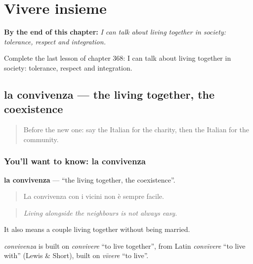 
\chapter{Vivere insieme}
\label{ch:it-vivere-insieme}

\begin{chapteropening}
\textbf{By the end of this chapter:} \emph{I can talk about living together in society: tolerance, respect and integration.}

Complete the last lesson of chapter 368: I can talk about living together in society: tolerance, respect and integration.
\end{chapteropening}

\section[la convivenza]{la convivenza — the living together, the coexistence}

\label{lesson:IT-C368-convivenza}



\begin{quote}
Before the new one: say the Italian for the charity, then the Italian for the community.
\end{quote}

\subsection*{You'll want to know: la convivenza}
\textbf{la convivenza} — \textquotedblleft{}the living together, the coexistence\textquotedblright{}.

\begin{quote}
La convivenza con i vicini non è sempre facile.
\end{quote}

\begin{quote}
\emph{Living alongside the neighbours is not always easy.}
\end{quote}

It also means a couple living together without being married.

\begin{cousinweb}
\emph{convivenza} is built on \emph{convivere} \textquotedblleft{}to live together\textquotedblright{}, from Latin \emph{convīvere} \textquotedblleft{}to live with\textquotedblright{} (Lewis \& Short), built on \emph{vīvere} \textquotedblleft{}to live\textquotedblright{}.
\end{cousinweb}

